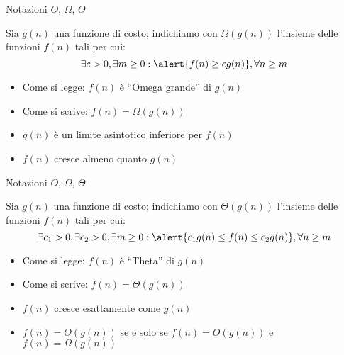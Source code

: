 \begin{frame}{Notazioni $O$, $\Omega$, $\Theta$}

\begin{myboxtitle}
Sia $g(n)$ una funzione di costo; indichiamo con $\Omega(g(n))$ l'insieme
delle funzioni $f(n)$ tali per cui:\\[-6pt]
\[
  \exists c>0, \exists m \geq 0: \alert{f(n) \geq cg(n)}, \forall n \geq m
\]
\end{myboxtitle}

\medskip
\begin{itemize}
\item Come si legge: $f(n)$ è “\alert{Omega grande}”  di $g(n)$
\item Come si scrive: $f(n) = \Omega(g(n))$
\item $g(n)$ è un \alert{limite asintotico inferiore} per $f(n)$
\item $f(n)$ cresce almeno quanto $g(n)$
\end{itemize}
\end{frame}

\begin{frame}{Notazioni $O$, $\Omega$, $\Theta$}

\begin{myboxtitle}
Sia $g(n)$ una funzione di costo; indichiamo con $\Theta(g(n))$ l'insieme
delle funzioni $f(n)$ tali per cui:\\[-6pt]
\[
  \exists c_1>0, \exists c_2>0, \exists m \geq 0: \alert{c_1g(n) \leq f(n) \leq c_2g(n)}, \forall n \geq m
\]
\end{myboxtitle}

\medskip
\begin{itemize}
\item Come si legge: $f(n)$ è “\alert{Theta}” di $g(n)$
\item Come si scrive: $f(n) = \Theta(g(n))$
\item $f(n)$ cresce esattamente come $g(n)$
\item $f(n) = \Theta(g(n))$ se e solo se $f(n) = O(g(n))$ e $f(n) = \Omega(g(n))$
\end{itemize}

\end{frame}

